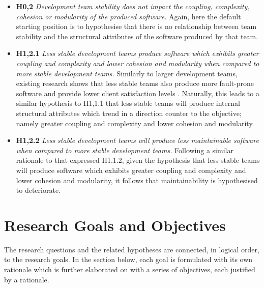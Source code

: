 \begin{itemize}
\begin{itemize}
\item \textbf{H0,2} \textit{Development team stability does not impact the coupling, complexity, cohesion or modularity of the produced software.} Again, here the default starting position is to hypothesise that there is no relationship between team stability and the structural attributes of the software produced by that team. 
\item \textbf{H1,2.1} \textit{Less stable development teams produce software which exhibits greater coupling and complexity and lower cohesion and modularity when compared to more stable development teams.} Similarly to larger development teams, existing research shows that less stable teams also produce more fault-prone software and provide lower client satisfaction levels \citep{huckman2009team, gardner2012dynamically}. Naturally, this leads to a similar hypothesis to H1,1.1 that less stable teams will produce internal structural attributes which trend in a direction counter to the objective; namely greater coupling and complexity and lower cohesion and modularity.
\item \textbf{H1,2.2} \textit{Less stable development teams will produce less maintainable software when compared to more stable development teams.} Following a similar rationale to that expressed H1.1.2, given the hypothesis that less stable teams will produce software which exhibits greater coupling and complexity and lower cohesion and modularity, it follows that maintainability is hypothesised to deteriorate.
\end{itemize}
\end{itemize}

\section{Research Goals and Objectives} %
The research questions and the related hypotheses are connected, in logical order, to the research goals. In the section below, each goal is formulated with its own rationale which is further elaborated on with a series of objectives, each justified by a rationale.

